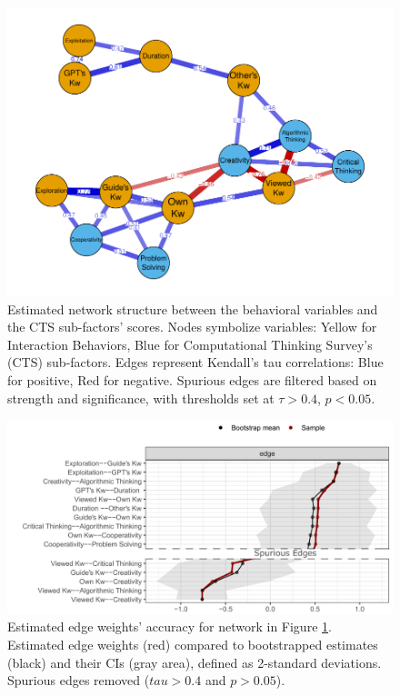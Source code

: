 \documentclass[sn-mathphys, Numbered]{sn-jnl}%
\theoremstyle{thmstyleone}%
\theoremstyle{thmstyletwo}%
\theoremstyle{thmstylethree}%
\begin{document}

\begin{figure}
    \centering
    \includegraphics[width=1\linewidth]{NetworkB-nolegend.pdf}
    \caption{Estimated network structure between the behavioral variables and the CTS sub-factors' scores. Nodes symbolize variables: Yellow for Interaction Behaviors, Blue for Computational Thinking Survey's (CTS) sub-factors. Edges represent Kendall's tau correlations: Blue for positive, Red for negative. Spurious edges are filtered based on strength and significance, with thresholds set at $\tau > 0.4$, $p < 0.05$. }
    \label{fig:Network B}
\end{figure}

\begin{figure}
    \centering
    \includegraphics[width=0.75\linewidth]{EdgewgtsBcutted.pdf}
    \caption{Estimated edge weights' accuracy for network in Figure \ref{fig:Network B}. Estimated edge weights (red) compared to bootstrapped estimates (black) and their CIs (gray area), defined as 2-standard deviations. Spurious edges removed ($tau > 0.4$ and $p > 0.05$).}
    \label{fig:weightaccB}
\end{figure}
\end{document}
